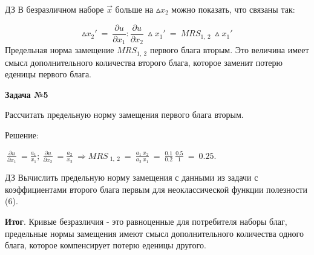 \documentclass[12pt,a4paper]{article}
\begin{document}
	$\displaystyle \boxed{\text{ДЗ}}$ В безразличном наборе $\displaystyle \vec{x}$ больше на $\displaystyle \vartriangle x_{2}$ можно показать, что связаны так:


\begin{equation}
\vartriangle x_{2} '\ =\ \frac{\partial u}{\partial x_{1}} :\frac{\partial u}{\partial x_{2}} \ \vartriangle x_{1} '\ =\ MRS_{1,\ 2} \ \vartriangle x_{1} '
\end{equation}
Предельная норма замещение $\displaystyle MRS_{1,\ 2}$ первого блага вторым. Это величина имеет смысл дополнительного количества второго блага, которое заменит потерю еденицы первого блага.

\textbf{Задача №5}

Рассчитать предельную норму замещения первого блага вторым.

Решение:

$\displaystyle \ \frac{\partial u}{\partial x_{1}} \ =\frac{a_{1}}{x_{1}} ;\ \frac{\partial u}{\partial x_{2}} \ =\frac{a_{2}}{x_{2}} \ \Rightarrow MRS\ _{1,\ 2} \ =\ \frac{a_{1} \ x_{2}}{a_{2} \ x_{1}} \ =\ \frac{0.1}{0.2} \ \frac{0.5}{1} \ =\ 0.25$.

$\displaystyle \boxed{\text{ДЗ}}$ Вычислить предельную норму замещения с данными из задачи с коэффициентами второго блага первым для неоклассической функции полезности (6).

\textbf{Итог}. Кривые безразличия - это равноценные для потребителя наборы благ, предельные нормы замещения имеют смысл дополнительного количества одного блага, которое компенсирует потерю еденицы другого.
\end{document}
